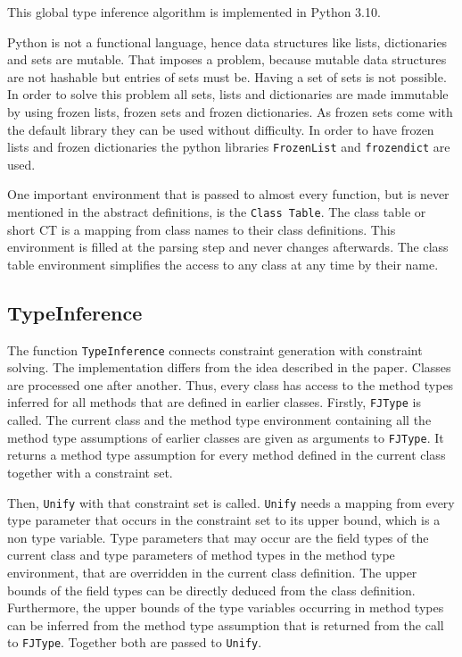 This global type inference algorithm is implemented in Python 3.10.

Python is not a functional language, hence data structures like lists, dictionaries and sets are mutable. That imposes a problem, because mutable data structures are not hashable but entries of sets must be. Having a set of sets is not possible.
In order to solve this problem all sets, lists and dictionaries are made immutable by using frozen lists, frozen sets and frozen dictionaries. As frozen sets come with the default library they can be used without difficulty. In order to have frozen lists and frozen dictionaries the python libraries \verb|FrozenList| and \verb|frozendict| are used.

One important environment that is passed to almost every function, but is never mentioned in the abstract definitions, is the \verb|Class Table|. The class table or short CT is a mapping from class names to their class definitions. This environment is filled at the parsing step and never changes afterwards. The class table environment simplifies the access to any class at any time by their name.\\

\subsection{TypeInference}

The function \verb|TypeInference| connects constraint generation with constraint solving. The implementation differs from the idea described in the paper.
Classes are processed one after another. Thus, every class has access to the method types inferred for all methods that are defined in earlier classes.
Firstly, \verb|FJType| is called. The current class and the method type environment containing all the method type assumptions of earlier classes are given as arguments to \verb|FJType|. It returns a method type assumption for every
method defined in the current class together with a constraint set.

Then, \verb|Unify| with that constraint set is called. \verb|Unify| needs a mapping from every type parameter that occurs in the constraint set to its upper bound, which is a non type variable.
Type parameters that may occur are the field types of the current class and type parameters of method types in the method type environment, that are overridden in the current class definition.
The upper bounds of the field types can be directly deduced from the class definition. Furthermore, the upper bounds of the type variables occurring in method types can be inferred from the method type assumption that is returned from the call to \verb|FJType|.
Together both are passed to \verb|Unify|.

